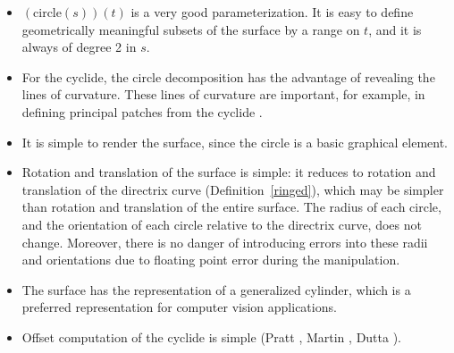 \begin{itemize}
\item
	$(\mbox{circle}(s))(t)$ is a very good parameterization.
	It is easy to define geometrically meaningful subsets of 
	the surface by a range on $t$, and it is always of degree 2 in $s$.
\item
	For the cyclide, the circle decomposition has the advantage
	of revealing the lines of curvature.
	These lines of curvature are important, for example,
	in defining principal patches from the cyclide
	\cite{DEP84,MAR82,SHAR85}.
\item
	It is simple to render the surface, since the circle is a basic
	graphical element.
\item
	Rotation and translation of the surface is simple:
	it reduces to rotation and translation of the directrix curve
	(Definition~\ref{ringed}), which may be simpler
	than rotation and translation of the entire surface.
	The radius of each circle,
	and the orientation of each circle relative to the directrix curve,
	does not change.
	Moreover, there is no danger of introducing errors into these 
	radii and orientations due to floating point error 
	during the manipulation.
\item
	The surface has the representation of a generalized cylinder,
	which is a preferred representation for computer vision applications.
\item
	Offset computation of the cyclide is simple 
	(Pratt \cite{P89}, %
	Martin \cite{MAR82}, Dutta \cite{Dutta89}).
\end{itemize}	


